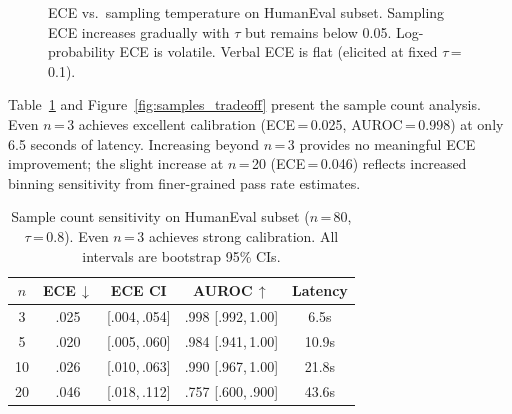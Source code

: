 \documentclass{article}
\begin{document}
\begin{figure}[t]
\centering
{}
\caption{ECE vs.\ sampling temperature on HumanEval subset. Sampling ECE increases gradually with $\tau$ but remains below 0.05. Log-probability ECE is volatile. Verbal ECE is flat (elicited at fixed $\tau$\,=\,0.1).}
\label{fig:temp_ece}
\vspace{-0.5em}
\end{figure}

Table~\ref{tab:samples} and Figure~\ref{fig:samples_tradeoff} present the sample count analysis. Even $n$\,=\,3 achieves excellent calibration (ECE\,=\,0.025, AUROC\,=\,0.998) at only 6.5 seconds of latency. Increasing beyond $n$\,=\,3 provides no meaningful ECE improvement; the slight increase at $n$\,=\,20 (ECE\,=\,0.046) reflects increased binning sensitivity from finer-grained pass rate estimates.

\begin{table}[t]
\centering
\caption{Sample count sensitivity on HumanEval subset ($n$\,=\,80, $\tau$\,=\,0.8). Even $n$\,=\,3 achieves strong calibration. All intervals are bootstrap 95\% CIs.}
\label{tab:samples}
\small
\setlength{\tabcolsep}{2.5pt}
\begin{tabular}{@{}ccccc@{}}
\toprule
$n$ & \textbf{ECE\,$\downarrow$} & \textbf{ECE CI} & \textbf{AUROC\,$\uparrow$} & \textbf{Latency} \\
\midrule
3  & .025 & {\scriptsize[.004,\,.054]} & .998 {\scriptsize[.992,\,1.00]} & 6.5s \\
5  & .020 & {\scriptsize[.005,\,.060]} & .984 {\scriptsize[.941,\,1.00]} & 10.9s \\
10 & .026 & {\scriptsize[.010,\,.063]} & .990 {\scriptsize[.967,\,1.00]} & 21.8s \\
20 & .046 & {\scriptsize[.018,\,.112]} & .757 {\scriptsize[.600,\,.900]} & 43.6s \\
\bottomrule
\end{tabular}
\vspace{-0.5em}
\end{table}
\end{document}
